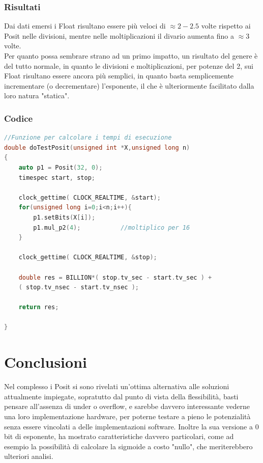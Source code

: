 \documentclass[a4paper,11pt]{article}
\begin{document}
\subsubsection{Risultati}

Dai dati emersi i Float risultano essere più veloci di $\approx 2-2.5$ volte rispetto ai Posit nelle divisioni, mentre nelle moltiplicazioni il divario aumenta fino a $\approx 3$ volte.\\
Per quanto possa sembrare strano ad un primo impatto, un risultato del genere è del tutto normale, in quanto le divisioni e moltiplicazioni, per potenze del 2, sui Float risultano essere ancora più semplici, in quanto basta semplicemente incrementare (o decrementare) l'esponente, il che è ulteriormente facilitato dalla loro natura "statica".

\subsubsection{Codice}
\begin{lstlisting}[language=C++]
//Funzione per calcolare i tempi di esecuzione
double doTestPosit(unsigned int *X,unsigned long n)
{
	auto p1 = Posit(32, 0);  
	timespec start, stop;
	
	clock_gettime( CLOCK_REALTIME, &start);
	for(unsigned long i=0;i<n;i++){
		p1.setBits(X[i]);	
		p1.mul_p2(4);			//moltiplico per 16
	}
	
	clock_gettime( CLOCK_REALTIME, &stop);
	
	double res = BILLION*( stop.tv_sec - start.tv_sec ) + 
	( stop.tv_nsec - start.tv_nsec );
	
	return res;

}


\end{lstlisting}

\newpage
\section{Conclusioni}
Nel complesso i Posit si sono rivelati un'ottima alternativa alle soluzioni attualmente impiegate, sopratutto dal punto di vista della flessibilità, basti pensare all'assenza di under o overflow, e sarebbe davvero interessante vederne una loro implementazione hardware, per poterne testare a pieno le potenzialità senza essere vincolati a delle implementazioni software. Inoltre la sua versione a 0 bit di esponente, ha mostrato caratteristiche davvero particolari, come ad esempio la possibilità di calcolare la sigmoide a costo "nullo", che meriterebbero ulteriori analisi.

\newpage




	
	\printbibliography[title=Bibliografia]

	
\end{document}
